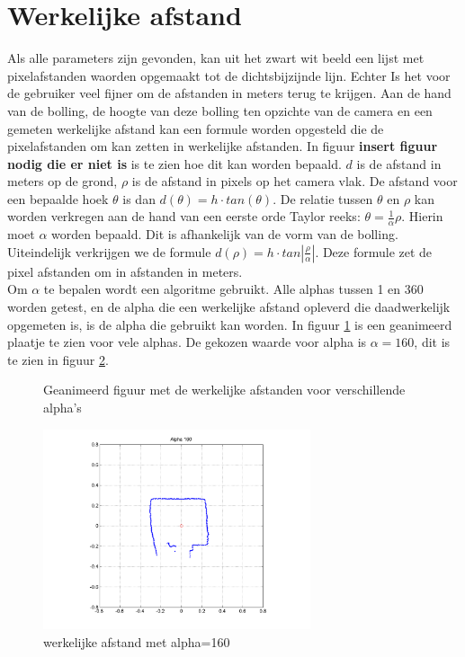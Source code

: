 \documentclass[a4paper]{article}
\begin{document}
\section{Werkelijke afstand}
Als alle parameters zijn gevonden, kan uit het zwart wit beeld een lijst met pixelafstanden waorden opgemaakt tot de dichtsbijzijnde lijn. Echter Is het voor de gebruiker veel fijner om de afstanden in meters terug te krijgen. Aan de hand van de bolling, de hoogte van deze bolling ten opzichte van de camera en een gemeten werkelijke afstand kan een formule worden opgesteld die de pixelafstanden om kan zetten in werkelijke afstanden. In figuur \textbf{insert figuur nodig die er niet is} is te zien hoe dit kan worden bepaald. $d$ is de afstand in meters op de grond, $\rho$ is de afstand in pixels op het camera vlak. De afstand voor een bepaalde hoek $\theta$ is dan $d(\theta)=h \cdot tan(\theta)$. De relatie tussen $\theta$ en $\rho$ kan worden  verkregen aan de hand van een eerste orde Taylor reeks: $\theta = \frac{1}{\alpha}\rho$. Hierin moet $\alpha$ worden bepaald. Dit is afhankelijk van de vorm van de bolling. Uiteindelijk verkrijgen we de formule $d(\rho)=h\cdot tan|\frac{\rho}{\alpha}|$. Deze formule zet de pixel afstanden om in afstanden in meters.\\
Om $\alpha$ te bepalen wordt een algoritme gebruikt. Alle alphas tussen 1 en 360 worden getest, en de alpha die een werkelijke afstand opleverd die daadwerkelijk opgemeten is, is de alpha die gebruikt kan worden. In figuur \ref{fig:anim_alpha} is een geanimeerd plaatje te zien voor vele alphas. De gekozen waarde voor alpha is $\alpha = 160$, dit is te zien in figuur \ref{fig:alpha160}. 

\begin{figure}[htbp]
	\caption{Geanimeerd figuur met de werkelijke afstanden voor verschillende alpha's}
 	\label{fig:anim_alpha}
\end{figure}

\begin{figure}[h]
	\centering
	\includegraphics[width=0.7\textwidth]{img/alpha/alpha_160.png}
	\caption{werkelijke afstand met alpha=160}
	\label{fig:alpha160}
\end{figure}
\end{document}
